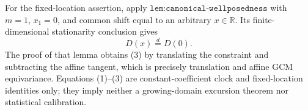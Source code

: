 For the fixed-location assertion, apply \(\texttt{lem:canonical-wellposedness}\) with \(m=1\), \(x_1=0\), and common shift equal to an arbitrary \(x\in\mathbb R\).  Its finite-dimensional stationarity conclusion gives
\[
 D(x)\stackrel{d}{=}D(0). \tag{3}
\]
The proof of that lemma obtains (3) by translating the constraint and subtracting the affine tangent, which is precisely translation and affine GCM equivariance.  Equations (1)--(3) are constant-coefficient clock and fixed-location identities only; they imply neither a growing-domain excursion theorem nor statistical calibration.

